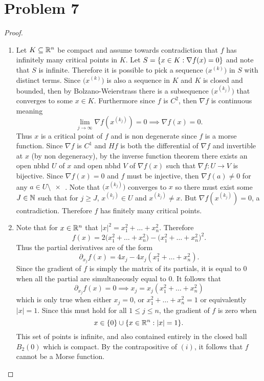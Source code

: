 \documentclass{eeleyes}
\begin{document}
\section*{Problem 7}
\begin{proof}
    \begin{enumerate}[label=\roman*)]
        \item Let $K \subseteq \mathbb{R}^n$ be compact and assume towards contradiction that $f$ has infinitely many critical points in $K$. Let $S = \qty{x \in K : \nabla f(x) = 0 }$ and note that $S$ is infinite. Therefore it is possible to pick a sequence $\bigl(x^{(k)}\bigr)$ in $S$ with distinct terms. Since $\bigl(x^{(k)}\bigr)$ is also a sequence in $K$ and $K$ is closed and bounded, then by Bolzano-Weierstrass there is a subsequence $\bigl(x^{(k_j)}\bigr)$ that converges to some $x \in K$. Furthermore since $f$ is $C^2$, then $\nabla f$ is continuous meaning
        \[
            \lim_{j \to \infty} \nabla f(x^{(k_j)}) = 0 \implies \nabla f(x) = 0
        .\]
        Thus $x$ is a critical point of $f$ and is non degenerate since $f$ is a morse function. Since $\nabla f$ is $C^1$ and $H f$ is both the differential of $\nabla f$ and invertible at $x$ (by non degeneracy), by the inverse function theorem there exists an open nbhd $U$ of $x$ and open nbhd $V$ of $\nabla f(x)$ such that $\nabla f : U \to V$ is bijective. Since $\nabla f(x) = 0$ and $f$ must be injective, then $\nabla f(a) \neq 0$ for any $a \in U \setminus\qty{x}$. Note that $\bigl(x^{(k_j)}\bigr)$ converges to $x$ so there must exist some $J \in \mathbb{N}$ such that for $j \geq J$, $x^{(k_j)} \in U$ and $x^{(k_j)} \neq x$. But $\nabla f(x^{(k_j)}) = 0$, a contradiction. Therefore $f$ has finitely many critical points.

        \item Note that for $x \in \mathbb{R}^n$ that $|x|^2 = x_1^2 + \ldots + x_n^2$. Therefore
            \[
                f(x) = 2 \bigl(x_1^2 + \ldots + x_n^2\bigr) - \bigl(x_1^2 + \ldots + x_n^2\bigr)^2
            .\]
            Thus the partial derivatives are of the form
            \[
                \partial_{x_j} f(x) = 4 x_j - 4 x_j (x_1^2 + \ldots + x_n^2)
            .\]
            Since the gradient of $f$ is simply the matrix of its partials, it is equal to $0$ when all the partial are simultaneously equal to $0$. It follows that
            \[
                \partial_{x_j} f(x) = 0 \implies  x_j = x_j (x_1^2 + \ldots + x_n^2)
            \]
            which is only true when either $x_j = 0$, or $x_1^2 + \ldots + x_n^2 = 1$ or equivalently $|x| = 1$. Since this must hold for all $1 \leq j \leq n$, the gradient of $f$ is zero when
            \[
                x \in \qty{0} \cup \qty{x \in \mathbb{R}^n : |x| = 1}
            .\]
            This set of points is infinite, and also contained entirely in the closed ball $B_2(0)$ which is compact. By the contrapositive of $(i)$, it follows that $f$ cannot be a Morse function.
    \end{enumerate}
\end{proof}
\end{document}
